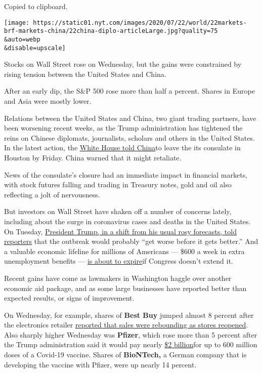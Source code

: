 Copied to clipboard.

\texttt{[image: https://static01.nyt.com/images/2020/07/22/world/22markets-brf-markets-china/22china-diplo-articleLarge.jpg?quality=75\\\&auto=webp\\\&disable=upscale]}

Stocks on Wall Street rose on Wednesday, but the gains were constrained
by rising tension between the United States and China.

After an early dip, the S\&P 500 rose more than half a percent. Shares
in Europe and Asia were mostly lower.

Relations between the United States and China, two giant trading
partners, have been worsening recent weeks, as the Trump administration
has tightened the reins on Chinese diplomats, journalists, scholars and
others in the United States. In the latest action, the
\href{https://www.nytimes.com/2020/07/22/world/asia/us-china-houston-consulate.html?action=click\&module=Top\%20Stories\&pgtype=Homepage}{White
House told China}to leave the its consulate in Houston by Friday. China
warned that it might retaliate.

News of the consulate's closure had an immediate impact in financial
markets, with stock futures falling and trading in Treasury notes, gold
and oil also reflecting a jolt of nervousness.

But investors on Wall Street have shaken off a number of concerns
lately, including about the surge in coronavirus cases and deaths in the
United States. On Tuesday,
\href{https://www.nytimes.com/2020/07/22/world/coronavirus-covid-19.html}{President
Trump, in a shift from his usual rosy forecasts, told reporters} that
the outbreak would probably ``get worse before it gets better.'' And a
valuable economic lifeline for millions of Americans --- \$600 a week in
extra unemployment benefits ---
\href{https://www.nytimes.com/2020/07/21/business/economy/coronavirus-unemployment-benefits.html}{is
about to expire}if Congress doesn't extend it.

Recent gains have come as lawmakers in Washington haggle over another
economic aid package, and as some large businesses have reported better
than expected results, or signs of improvement.

On Wednesday, for example, shares of \textbf{Best Buy} jumped almost 8
percent after the electronics retailer
\href{https://www.nytimes.com/live/2020/07/21/business/stock-market-today-coronavirus/best-buy-to-join-retailers-paying-a-15-minimum-wage}{reported
that sales were rebounding as stores reopened}. Also sharply higher
Wednesday was \textbf{Pfizer}, which rose more than 5 percent after the
Trump administration said it would pay nearly
\href{https://www.nytimes.com/2020/07/22/us/politics/pfizer-gets-1-95-billion-to-produce-covid-19-vaccine-by-years-end.html}{\$2
billion}for up to 600 million doses of a Covid-19 vaccine. Shares of
\textbf{BioNTech,} a German company that is developing the vaccine with
Pfizer, were up nearly 14 percent.

